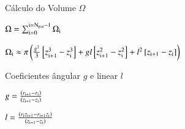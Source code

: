 \documentclass[8pt]{beamer}
\begin{document}
\begin{frame}
\begin{block}{Cálculo do Volume $\Omega$}
\begin{minipage}{0.3\textwidth}
					\begin{center}
						 $\Omega=\sum_{\rm i=0}^{\rm i = N_{\rm p,a} -1}\Omega_{\rm i}$
					\end{center}
		    \end{minipage}
			\begin{minipage}{0.69\textwidth}
					\begin{center}
				 		$\Omega_{\rm i} \approx \pi  \left ( \frac{g^{\rm 2}}{3}  \left [ z_{\rm i+1}^{\rm 3} - z_{\rm i}^{\rm 3}  \right ] + gl\left [ z_{\rm i+1}^{\rm 2} - z_{\rm i}^{\rm 2} \right ] +  l^{\rm 2}\left [ z_{\rm i+1} - z_{\rm i}  \right ]   \right )$
					\end{center}
			\end{minipage}
	    \end{block}		
    	\vspace{-0.4cm}
		\begin{block}{Coeficientes ângular $g$ e linear $l$}
			\begin{minipage}{0.49\textwidth}
				\begin{center}
					$g = \frac{\left ( r_{\rm i+1} - r_{\rm i} \right )}{\left ( z_{\rm i+1} - z_{\rm i} \right )}$			
				\end{center}
			\end{minipage}
			\begin{minipage}{0.49\textwidth}
				\begin{center}
	   			    $l = \frac{\left ( r_{\rm i}z_{\rm i+1} - r_{\rm i+1}z_{\rm i} \right )}{\left ( z_{\rm i+1} - z_{\rm i} \right )}$
				\end{center}
			\end{minipage}
	    \end{block}		
\end{frame}
\end{document}
